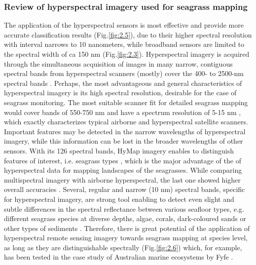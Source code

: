 \documentclass[11pt]{article}
\begin{document}
\subsubsection[Review of hyperspectral imagery...]{Review of hyperspectral imagery used for seagrass mapping}\label{sec:2.4.2}
The application of the hyperspectral sensors \label{page-20} is most effective and provide more accurate classification
results  (Fig.\ref{fig:2.5}), due to their higher spectral resolution \cite{Bharathi03}\label{Bharathi03} with interval
narrows to 10 nanometers, while broadband sensors are limited to the spectral width of ca
150 nm  (Fig.\ref{fig:2.3}). 
Hyperspectral imagery is acquired through the simultaneous acquisition of images in many
narrow, contiguous spectral bands from hyperspectral scanners (mostly) cover the 400-
to 2500-nm spectral bands \cite{Schmidt03}\label{Schmidt03}.
Perhaps, the most advantageous and general characteristics of hyperspectral imagery is its
high spectral resolution, desirable for the case of seagrass monitoring. 
The most suitable scanner fit for detailed seagrass mapping would cover bands of 550-750 nm and have a spectrum
resolution of 5-15 nm \cite{Fyfe04}\label{Fyfe04}, which exactly characterizes typical airborne and
hyperspectral satellite scanners. Important features may be detected in the narrow
wavelengths of hyperspectral imagery, while this information can be lost in the broader
wavelengths of other sensors. With its 126 spectral bands, \ac{HyMap} imagery enables to
distinguish features of interest, i.e. seagrass types \cite{Peneva07}\label{Peneva07}, which is the major
advantage of the of hyperspectral data for mapping landscapes of the seagrasses.
While comparing multispectral imagery with airborne hyperspectral, the last one showed higher
overall accuracies \cite{Phinn08}\label{Phinn08}. Several, regular and narrow (10 nm) spectral bands\label{sec:2.4.2}, specific for
hyperspectral imagery, are strong tool enabling to detect even slight and subtle differences in the
spectral reflectance between various seafloor types, e.g. different seagrass species at diverse depths,
algae, corals, dark-coloured sands or other types of sediments \cite{Hochberg03a}\label{Hochberg03a}. 
Therefore, there is great potential of the application of hyperspectral remote sensing imagery towards seagrass
mapping at species level, as long as they are distinguishable spectrally (Fig.\ref{fig:2.6}) which, for example, has been
tested in the case study of Australian marine ecosystems by Fyfe \cite{Fyfe04}\label{Fyfe04}. 
\end{document}
